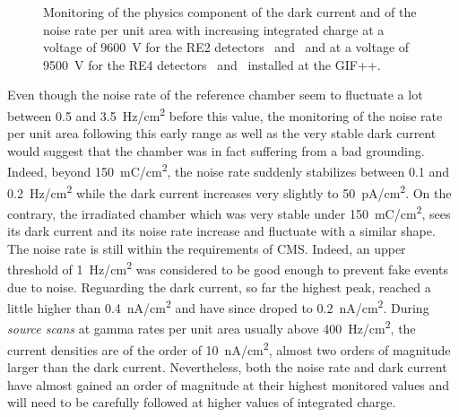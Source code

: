 \begin{figure}[H]
\begin{subfigure}{0.5\linewidth}
        	\caption{\label{fig:GIFpp-Dark-rate-mon:D}}
    	\end{subfigure}
		\caption{\label{fig:GIFpp-Dark-rate-mon} Monitoring of the physics component of the dark current and of the noise rate per unit area with increasing integrated charge at a voltage of \SI{9600}{V} for the RE2 detectors~ and~ and at a voltage of \SI{9500}{V} for the RE4 detectors~ and~ installed at the GIF++.}
	\end{figure}
	
	Even though the noise rate of the reference chamber seem to fluctuate a lot between 0.5 and \SI{3.5}{Hz/cm^2} before this value, the monitoring of the noise rate per unit area following this early range as well as the very stable dark current would suggest that the chamber was in fact suffering from a bad grounding. Indeed, beyond \SI{150}{mC/cm^2}, the noise rate suddenly stabilizes between 0.1 and \SI{0.2}{Hz/cm^2} while the dark current increases very slightly to \SI{50}{pA/cm^2}. On the contrary, the irradiated chamber which was very stable under \SI{150}{mC/cm^2}, sees its dark current and its noise rate increase and fluctuate with a similar shape. The noise rate is still within the requirements of CMS. Indeed, an upper threshold of \SI{1}{Hz/cm^2} was considered to be good enough to prevent fake events due to noise. Reguarding the dark current, so far the highest peak, reached a little higher than \SI{0.4}{nA/cm^2} and have since droped to \SI{0.2}{nA/cm^2}. During \textit{source scans} at gamma rates per unit area usually above \SI{400}{Hz/cm^2}, the current densities are of the order of \SI{10}{nA/cm^2}, almost two orders of magnitude larger than the dark current. Nevertheless, both the noise rate and dark current have almost gained an order of magnitude at their highest monitored values and will need to be carefully followed at higher values of integrated charge.

